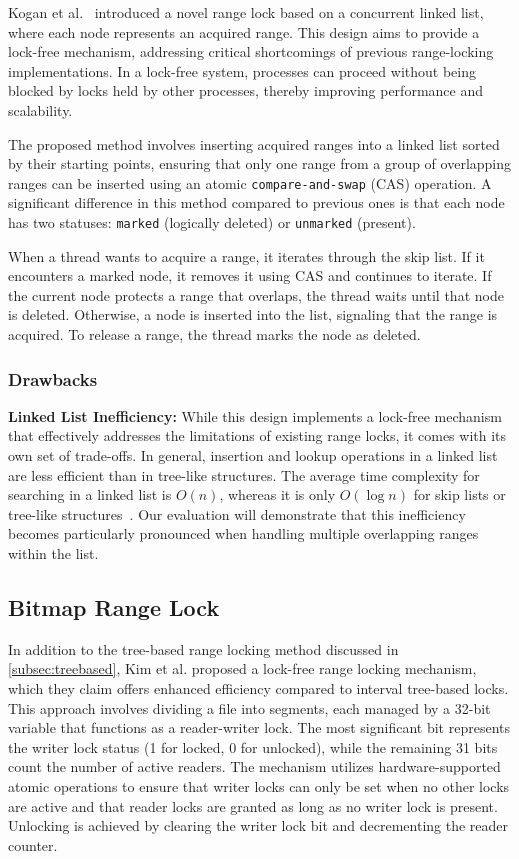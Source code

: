 Kogan et al.~\parencite{kogan2020scalable} introduced a novel range lock based on a concurrent linked list, where each node represents an acquired range. This design aims to provide a lock-free mechanism, addressing critical shortcomings of previous range-locking implementations. In a lock-free system, processes can proceed without being blocked by locks held by other processes, thereby improving performance and scalability.

The proposed method involves inserting acquired ranges into a linked list sorted by their starting points, ensuring that only one range from a group of overlapping ranges can be inserted using an atomic \texttt{compare-and-swap} (CAS) operation. A significant difference in this method compared to previous ones is that each node has two statuses: \texttt{marked} (logically deleted) or \texttt{unmarked} (present).

When a thread wants to acquire a range, it iterates through the skip list. If it encounters a marked node, it removes it using CAS and continues to iterate. If the current node protects a range that overlaps, the thread waits until that node is deleted. Otherwise, a node is inserted into the list, signaling that the range is acquired. To release a range, the thread marks the node as deleted.

\subsubsection*{Drawbacks}

\textbf{Linked List Inefficiency:} While this design implements a lock-free mechanism that effectively addresses the limitations of existing range locks, it comes with its own set of trade-offs. In general, insertion and lookup operations in a linked list are less efficient than in tree-like structures. The average time complexity for searching in a linked list is \( O(n) \), whereas it is only \( O(\log n) \) for skip lists or tree-like structures~\parencite{fomitchev2004lock}. Our evaluation will demonstrate that this inefficiency becomes particularly pronounced when handling multiple overlapping ranges within the list.

\subsection{Bitmap Range Lock}

In addition to the tree-based range locking method discussed in \ref{subsec:treebased}, Kim et al. proposed a lock-free range locking mechanism, which they claim offers enhanced efficiency compared to interval tree-based locks. 
This approach involves dividing a file into segments, each managed by a 32-bit variable that functions as a reader-writer lock. The most significant bit represents the writer lock status (1 for locked, 0 for unlocked), while the remaining 31 bits count the number of active readers. 
The mechanism utilizes hardware-supported atomic operations to ensure that writer locks can only be set when no other locks are active and that reader locks are granted as long as no writer lock is present. 
Unlocking is achieved by clearing the writer lock bit and decrementing the reader counter. 

